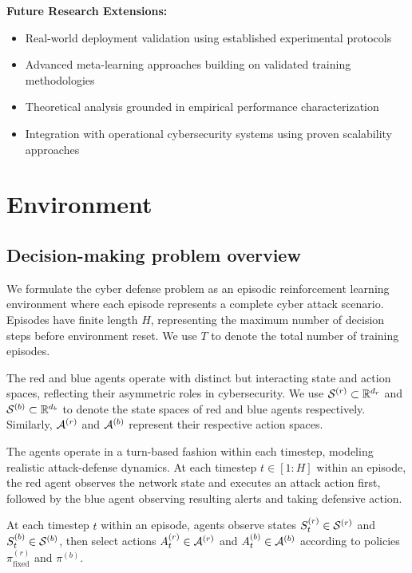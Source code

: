 \documentclass[12pt,twoside]{article}
\begin{document}
\textbf{Future Research Extensions:}
\begin{itemize}
\item Real-world deployment validation using established experimental protocols
\item Advanced meta-learning approaches building on validated training methodologies
\item Theoretical analysis grounded in empirical performance characterization
\item Integration with operational cybersecurity systems using proven scalability approaches
\end{itemize}

\section{Environment}

\subsection{Decision-making problem overview}

We formulate the cyber defense problem as an episodic reinforcement learning environment where each episode represents a complete cyber attack scenario. Episodes have finite length $H$, representing the maximum number of decision steps before environment reset. We use $T$ to denote the total number of training episodes.

The red and blue agents operate with distinct but interacting state and action spaces, reflecting their asymmetric roles in cybersecurity. We use $\mathcal{S}^{(r)} \subset \mathbb{R}^{d_r}$ and $\mathcal{S}^{(b)} \subset \mathbb{R}^{d_b}$ to denote the state spaces of red and blue agents respectively. Similarly, $\mathcal{A}^{(r)}$ and $\mathcal{A}^{(b)}$ represent their respective action spaces.

The agents operate in a turn-based fashion within each timestep, modeling realistic attack-defense dynamics. At each timestep $t \in [1:H]$ within an episode, the red agent observes the network state and executes an attack action first, followed by the blue agent observing resulting alerts and taking defensive action.

At each timestep $t$ within an episode, agents observe states $S_t^{(r)} \in \mathcal{S}^{(r)}$ and $S_t^{(b)} \in \mathcal{S}^{(b)}$, then select actions $A_t^{(r)} \in \mathcal{A}^{(r)}$ and $A_t^{(b)} \in \mathcal{A}^{(b)}$ according to policies $\pi^{(r)}_{\text{fixed}}$ and $\pi^{(b)}$.
\end{document}

